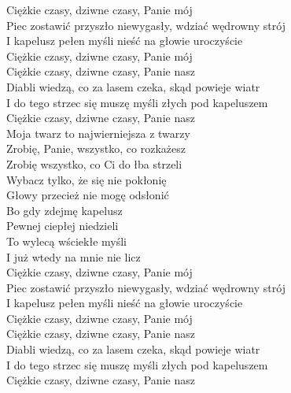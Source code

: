 
\begin{flushleft}
Ciężkie czasy, dziwne czasy, Panie mój \tab{}\\
Piec zostawić przyszło niewygasły, wdziać wędrowny strój  \\
I kapelusz pełen myśli nieść na głowie uroczyście \\
Ciężkie czasy, dziwne czasy, Panie mój \tab{}\\
\vskip 3mm
Ciężkie czasy, dziwne czasy, Panie nasz \\
Diabli wiedzą, co za lasem czeka, skąd powieje wiatr \\
I do tego strzec się muszę myśli złych pod kapeluszem \\
Ciężkie czasy, dziwne czasy, Panie nasz \\
\vskip 3mm
\hspace{0.9cm}Moja twarz to najwierniejsza z twarzy \\
\hspace{0.9cm}Zrobię, Panie, wszystko, co rozkażesz \\
\hspace{0.9cm}Zrobię wszystko, co Ci do łba strzeli \\
\hspace{0.9cm}Wybacz tylko, że się nie pokłonię \\
\hspace{0.9cm}Głowy przecież nie mogę odsłonić \\
\vskip 3mm
\hspace{0.9cm}Bo gdy zdejmę kapelusz \tab{} \\
\hspace{0.9cm}Pewnej ciepłej niedzieli \tab{}\\
\hspace{0.9cm}To wylecą wściekłe myśli \tab{}\\
\hspace{0.9cm}I już wtedy na mnie nie licz \\
\vskip 3mm
Ciężkie czasy, dziwne czasy, Panie mój \\
Piec zostawić przyszło niewygasły, wdziać wędrowny strój \\
I kapelusz pełen myśli nieść na głowie uroczyście \\
Ciężkie czasy, dziwne czasy, Panie mój \\
\vskip 3mm
Ciężkie czasy, dziwne czasy, Panie nasz \\
Diabli wiedzą, co za lasem czeka, skąd powieje wiatr \\
I do tego strzec się muszę myśli złych pod kapeluszem \\
Ciężkie czasy, dziwne czasy, Panie nasz \\
\end{flushleft}
\clearpage

